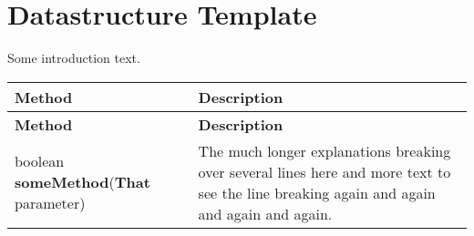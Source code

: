 \documentclass[main]{subfiles}
\begin{document}

\section{Datastructure Template}
\renewcommand{\arraystretch}{1.5}


Some introduction text.

\scriptsize
\begin{longtable}{p{0.4\linewidth} p{0.6\linewidth}}
\hline \textbf{Method} & \textbf{Description}\\ \hline
\endfirsthead

\hline \textbf{Method} & \textbf{Description}\\ \hline\hline
\endhead
boolean \textbf{someMethod}(\textbf{That} parameter) & The much longer explanations breaking over several lines here and more text to see the line breaking again and again and again and again.\\
\end{longtable}
\todo[inline]{}
\end{document}
